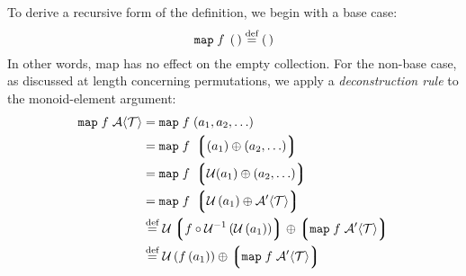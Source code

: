 
To derive a recursive form of the definition, we begin with a base case:
\begin{equation}
  \mathtt{map}\;f\;\left(\,\right)\overset{\text{def}}{=}\left(\,\right)
\end{equation}
In other words, map has no effect on the empty collection. For the non-base case, as discussed at length concerning permutations, we apply a \emph{deconstruction rule} to the monoid-element argument:
\begin{align}
  \mathtt{map}\;f\;\mathcal{A}\langle\mathcal{T}\rangle
     &=\mathtt{map}\;f\;(a_1,a_2,\ldots)\nonumber\\
  {} &= \mathtt{map}\;f\;\left\lgroup (a_1)\oplus(a_2,\ldots)\right\rgroup 
         \nonumber\\
  {} &= \mathtt{map}\;f\;\left\lgroup \mathcal{U}(a_1)\oplus(a_2,\ldots)\right\rgroup
         \nonumber\\
  {} &= \mathtt{map}\;f\;\left\lgroup
     \mathcal{U}\left(a_1\right)\oplus{\mathcal{A}'\langle\mathcal{T}\rangle}
     \right\rgroup \nonumber\\
  {} &\overset{\text{def}}{=}\mathcal{U}\left\lgroup
     f\circ\mathcal{U}^{-1}\left(
     \mathcal{U}\left(a_1\right)\right)\right\rgroup\oplus
     \left\lgroup\mathtt{map}\;f\;{\mathcal{A}'\langle\mathcal{T}\rangle}\right\rgroup
     \label{def:mapdefone}\\
  {} &\overset{\text{def}}{=}\mathcal{U}\left(f\left(a_1\right)\right)\oplus
     \left\lgroup\mathtt{map}\;f\;{\mathcal{A}'\langle\mathcal{T}\rangle}\right\rgroup
     \label{def:mapdeftwo}
\end{align}

